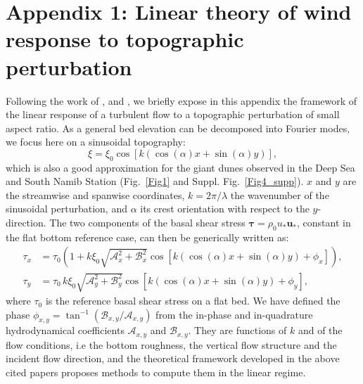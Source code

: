 \section*{Appendix 1: Linear theory of wind response to topographic perturbation}
\label{turbulent_wind_model}

Following the work of \citet{Fourriere2010}, \citet{Andreotti2012} and \citet{andreotti2009}, we briefly expose in this appendix the framework of the linear response of a turbulent flow to a topographic perturbation of small aspect ratio. As a general bed elevation can be decomposed into Fourier modes, we focus here on a sinusoidal topography:
%
\begin{equation}
\xi = \xi_{0}\cos\left[k\left(\cos(\alpha)x + \sin(\alpha)y\right)\right],
\end{equation}
%
which is also a good approximation for the giant dunes observed in the Deep Sea and South Namib Station (Fig.~\ref{Fig1} and Suppl. Fig.~\ref{Fig4_supp}). $x$ and $y$ are the streamwise and spanwise coordinates, $k=2\pi/\lambda$ the wavenumber of the sinusoidal perturbation, and $\alpha$ its crest orientation with respect to the $y$-direction. The two components of the basal shear stress $\boldsymbol{\tau} = \rho_{0} u_{*}\boldsymbol{u}_{*}$, constant in the flat bottom reference case, can then be generically written as:
%
\begin{align}
\tau_{x} & = \tau_{0}\left(1 + k\xi_{0}\sqrt{\mathcal{A}_{x}^{2} + \mathcal{B}_{x}^{2}}\cos\left[k\left(\cos(\alpha)x + \sin(\alpha)y\right) + \phi_{x}\right]\right), \\
\tau_{y} & = \tau_{0} \, k\xi_{0}\sqrt{\mathcal{A}_{y}^{2} + \mathcal{B}_{y}^{2}}\cos\left[k\left(\cos(\alpha)x + \sin(\alpha)y\right) + \phi_{y}\right],
\end{align}
%
where $\tau_{0}$ is the reference basal shear stress on a flat bed. We have defined the phase $\phi_{x, y} = \tan^{-1}\left(\mathcal{B}_{x, y}/\mathcal{A}_{x, y}\right)$ from the in-phase and in-quadrature hydrodynamical coefficients $\mathcal{A}_{x, y}$ and $\mathcal{B}_{x, y}$. They are functions of $k$ and of the flow conditions, i.e the bottom roughness, the vertical flow structure and the incident flow direction, and the theoretical framework developed in the above cited papers proposes methods to compute them in the linear regime.

